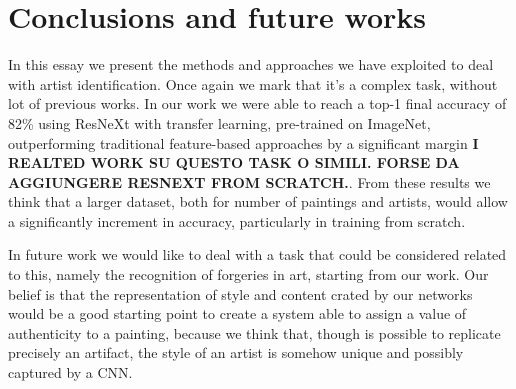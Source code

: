 \documentclass{article}
\begin{document}
\section{Conclusions and future works}\label{conclusions}
In this essay we present the methods and approaches we have exploited to deal with artist identification. Once again we mark that it's a complex task, without lot of previous works. 
In our work we were able to reach a top-1 final accuracy of 82\% using ResNeXt with transfer learning, pre-trained on ImageNet, outperforming traditional feature-based approaches by a significant margin\textbf{ I REALTED WORK SU QUESTO TASK O SIMILI. FORSE DA AGGIUNGERE RESNEXT FROM SCRATCH.}. From these results we think that a larger dataset, both for number of paintings and artists, would allow a significantly increment in accuracy, particularly in training from scratch.

In future work we would like to deal with a task that could be considered related to this, namely the recognition of forgeries in art, starting from our work. Our belief is that the representation of style and content crated by our networks would be a good starting point to create a system able to assign a value of authenticity to a painting, because we think that, though is possible to replicate precisely an artifact, the style of an artist is somehow unique and possibly captured by a CNN.
\end{document}
